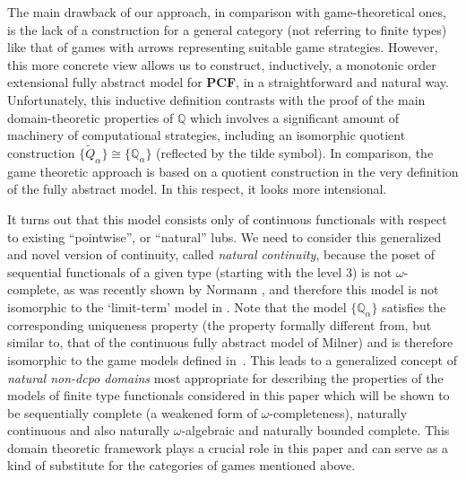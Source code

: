 \documentclass[fleqn]{LMCS}
\theoremstyle{plain}\newtheorem{satz}[thm]{Satz}
\theoremstyle{plain}\newtheorem{hyp}[thm]{Hypothesis}
\theoremstyle{plain}\newtheorem{hyps}[thm]{Hypotheses}
\theoremstyle{definition}\newtheorem{note}[thm]{Note}
\newcommand{\setof}[1]{\{#1\}}
\newcommand{\bbQ}{\mathbb{Q}}
\newcommand{\PCF}{\mbox{\bf PCF}}
\newcommand{\tQ}{\tilde{Q}}
\newcommand{\?}{\mbox{?}}
\begin{document}
The main drawback of our approach, in comparison with 
game-theoretical ones, 
is the lack of a construction 
for a general category (not referring to finite types) 
like that of games with arrows representing suitable game strategies. However, 
this more concrete view allows 
us to construct, inductively, 
a monotonic order extensional fully abstract model for \PCF,  
in a straightforward and natural way. 
Unfortunately, this inductive definition contrasts with the 
proof of the main domain-theoretic properties of $\bbQ$ 
which involves a significant amount of machinery 
of computational strategies, 
including an isomorphic quotient construction 
$\setof{\tQ_{\alpha}}\cong\setof{\bbQ_{\alpha}}$ 
(reflected by the tilde symbol). 
In comparison, the game theoretic approach is based on a quotient 
construction in the very definition of the fully abstract model. 
In this respect, it looks 
more intensional. 


It turns out that this model consists only of continuous 
functionals with respect to existing ``pointwise'', or 
``natural'' lubs. We need to consider this generalized and novel version 
of continuity, called \emph{natural continuity}, because the poset of 
sequential functionals of a given type (starting with the level 3) is not 
$\omega$-complete, 
as was recently shown by Normann \cite{Normann2004}, 
and therefore this model is not isomorphic 
to the `limit-term' model in \cite{Milner77}. 
Note that the model $\setof{\bbQ_\alpha}$ 
satisfies the corresponding uniqueness 
property 
(the property formally different from, but similar to, that of 
the continuous fully abstract model of Milner) 
and is therefore isomorphic to the game models 
defined in~\cite{Abramsky-Jagadeesan2000,Hyland-Ong2000}. 
This leads to a generalized concept of \emph{natural non-dcpo domains} 
most appropriate for describing the properties of the models 
of finite type functionals considered in this paper 
which will be shown to be  
sequentially complete 
(a weakened form of $\omega$-completeness), 
naturally continuous 
and also 
naturally $\omega$-algebraic and 
naturally bounded complete. This domain theoretic framework 
plays a crucial role in this paper and can serve as a kind of substitute for 
the categories of games mentioned above. 
\end{document}
